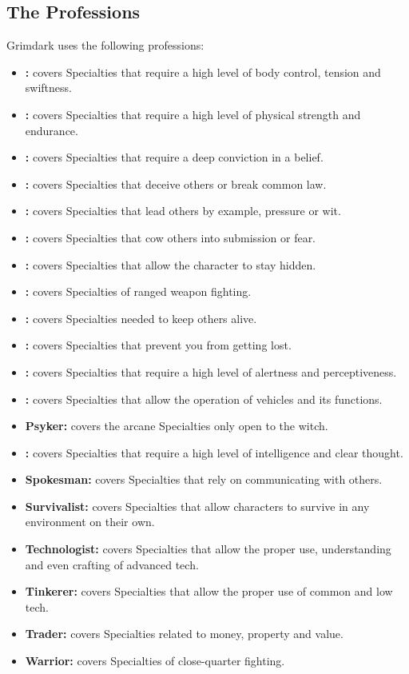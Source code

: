 \subsection{The Professions}
Grimdark uses the following professions:
\begin{itemize}
	\item \textbf{:} covers Specialties that require a high level of body control, tension and swiftness.
	\item \textbf{:} covers Specialties that require a high level of physical strength and endurance.
	\item \textbf{:} covers Specialties that require a deep conviction in a belief.
	\item \textbf{:} covers Specialties that deceive others or break common law.
	\item \textbf{:} covers Specialties that lead others by example, pressure or wit.
	\item \textbf{:} covers Specialties that cow others into submission or fear.
	\item \textbf{:} covers Specialties that allow the character to stay hidden.
	\item \textbf{:} covers Specialties of ranged weapon fighting.
	\item \textbf{:} covers Specialties needed to keep others alive.
	\item \textbf{:} covers Specialties that prevent you from getting lost.
	\item \textbf{:} covers Specialties that require a high level of alertness and perceptiveness.
	\item \textbf{:} covers Specialties that allow the operation of vehicles and its functions.
	\item \textbf{Psyker:} covers the arcane Specialties only open to the witch.
	\item \textbf{:} covers Specialties that require a high level of intelligence and clear thought.
	\item \textbf{Spokesman:} covers Specialties that rely on communicating with others.
	\item \textbf{Survivalist:} covers Specialties that allow characters to survive in any environment on their own.
	\item \textbf{Technologist:} covers Specialties that allow the proper use, understanding and even crafting of advanced tech.
	\item \textbf{Tinkerer:} covers Specialties that allow the proper use of common and low tech.
	\item \textbf{Trader:} covers Specialties related to money, property and value.
	\item \textbf{Warrior:} covers Specialties of close-quarter fighting.
\end{itemize}

